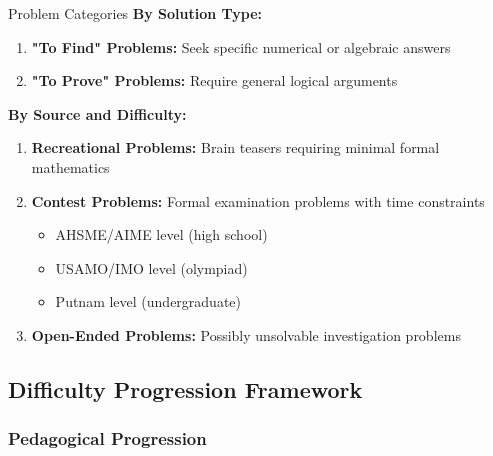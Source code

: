 \documentclass[12pt]{article}
\begin{document}
	\begin{examplebox}{Problem Categories}
		\textbf{By Solution Type:}
		\begin{enumerate}
			\item \textbf{"To Find" Problems:} Seek specific numerical or algebraic answers
			\item \textbf{"To Prove" Problems:} Require general logical arguments
		\end{enumerate}
		
		\textbf{By Source and Difficulty:}
		\begin{enumerate}
			\item \textbf{Recreational Problems:} Brain teasers requiring minimal formal mathematics
			\item \textbf{Contest Problems:} Formal examination problems with time constraints
			\begin{itemize}
				\item AHSME/AIME level (high school)
				\item USAMO/IMO level (olympiad)
				\item Putnam level (undergraduate)
			\end{itemize}
			\item \textbf{Open-Ended Problems:} Possibly unsolvable investigation problems
		\end{enumerate}
	\end{examplebox}
	
	\subsection{Difficulty Progression Framework}
	
	\subsubsection{Pedagogical Progression}
	
\end{document}
